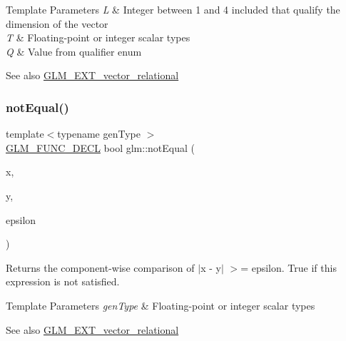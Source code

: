 \begin{DoxyTemplParams}{Template Parameters}
{\em L} & Integer between 1 and 4 included that qualify the dimension of the vector \\
\hline
{\em T} & Floating-\/point or integer scalar types \\
\hline
{\em Q} & Value from qualifier enum\\
\hline
\end{DoxyTemplParams}
\begin{DoxySeeAlso}{See also}
\mbox{\hyperlink{group__ext__vector__relational}{G\+L\+M\+\_\+\+E\+X\+T\+\_\+vector\+\_\+relational}} 
\end{DoxySeeAlso}
\mbox{\label{group__ext__vector__relational_ga27c5118811bcfed5504e50f22693373e}} 
\subsubsection{\texorpdfstring{not\+Equal()}{notEqual()}\hspace{0.1cm}{\footnotesize\ttfamily [3/3]}}
{\footnotesize\ttfamily template$<$typename gen\+Type $>$ \\
\mbox{\hyperlink{setup_8hpp_ab2d052de21a70539923e9bcbf6e83a51}{G\+L\+M\+\_\+\+F\+U\+N\+C\+\_\+\+D\+E\+CL}} bool glm\+::not\+Equal (\begin{DoxyParamCaption}\item[{gen\+Type const \&}]{x,  }\item[{gen\+Type const \&}]{y,  }\item[{gen\+Type const \&}]{epsilon }\end{DoxyParamCaption})}

Returns the component-\/wise comparison of $\vert$x -\/ y$\vert$ $>$= epsilon. True if this expression is not satisfied.


\begin{DoxyTemplParams}{Template Parameters}
{\em gen\+Type} & Floating-\/point or integer scalar types\\
\hline
\end{DoxyTemplParams}
\begin{DoxySeeAlso}{See also}
\mbox{\hyperlink{group__ext__vector__relational}{G\+L\+M\+\_\+\+E\+X\+T\+\_\+vector\+\_\+relational}} 
\end{DoxySeeAlso}
